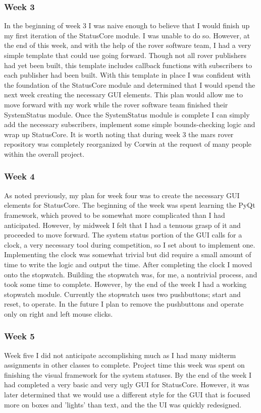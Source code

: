 \subsubsection{Week 3}
In the beginning of week 3 I was naive enough to believe that I would finish up my first iteration of the StatusCore module.
I was unable to do so.
However, at the end of this week, and with the help of the rover software team, I had a very simple template that could use going forward.
Though not all rover publishers had yet been built, this template includes callback functions with subscribers to each publisher had been built.
With this template in place I was confident with the foundation of the StatusCore module and determined that I would spend the next week creating the necessary GUI elements.
This plan would allow me to move forward with my work while the rover software team finished their SystemStatus module.
Once the SystemStatus module is complete I can simply add the necessary subscribers, implement some simple bounds-checking logic and wrap up StatusCore.
It is worth noting that during week 3 the mars rover repository was completely reorganized by Corwin at the request of many people within the overall project.
\subsubsection{Week 4}
As noted previously, my plan for week four was to create the necessary GUI elements for StatusCore.
The beginning of the week was spent learning the PyQt framework, which proved to be somewhat more complicated than I had anticipated.
However, by midweek I felt that I had a tenuous grasp of it and proceeded to move forward.
The system status portion of the GUI calls for a clock, a very necessary tool during competition, so I set about to implement one.
Implementing the clock was somewhat trivial but did require a small amount of time to write the logic and output the time.
After completing the clock I moved onto the stopwatch.
Building the stopwatch was, for me, a nontrivial process, and took some time to complete.
However, by the end of the week I had a working stopwatch module.
Currently the stopwatch uses two pushbuttons; start and reset, to operate. 
In the future I plan to remove the pushbuttons and operate only on right and left mouse clicks.
\subsubsection{Week 5}
Week five I did not anticipate accomplishing much as I had many midterm assignments in other classes to complete.
Project time this week was spent on finishing the visual framework for the system statuses.
By the end of the week I had completed a very basic and very ugly GUI for StatusCore.
However, it was later determined that we would use a different style for the GUI that is focused more on boxes and 'lights' than text, and the the UI was quickly redesigned.
